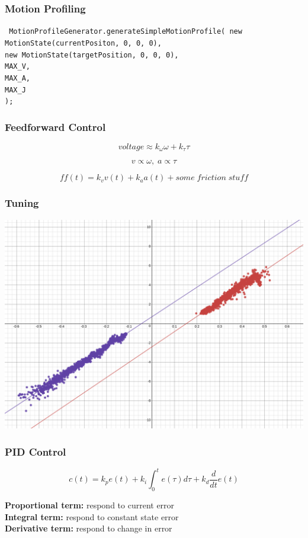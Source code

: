 \documentclass{beamer}
\begin{document}
\begin{frame}
	\frametitle{Motion Profiling}
	\texttt{
MotionProfileGenerator.generateSimpleMotionProfile(
	new MotionState(currentPositon, 0, 0, 0),\\
        new MotionState(targetPosition, 0, 0, 0),\\
        MAX\_V,\\
        MAX\_A,\\
        MAX\_J\\
);
}

\end{frame}
	
\begin{frame}
	\frametitle{Feedforward Control}
	$$voltage  \approx k_\omega \omega + k_\tau \tau$$

	$$v \propto \omega,\; a \propto \tau$$
	
	$$ff(t) = k_v v(t) + k_a a(t) + {some\; friction\; stuff}$$ 

\end{frame}

\begin{frame}
	\frametitle{Tuning}
	\centering
	\includegraphics[width=.8\textwidth]{lift1.png}
\end{frame}

\begin{frame}
	\frametitle{PID Control}
	$$c(t) = k_p e(t) + k_i \int_0^t{e(\tau)}d\tau + k_d \frac{d}{dt}e(t)$$ 
	
	\vspace{1cm}

	\textbf{Proportional term:} 
	respond to current error\\
	\textbf{Integral term:} 
	respond to constant state error\\
	\textbf{Derivative term:} 
	respond to change in error\\
\end{frame}
\end{document}
